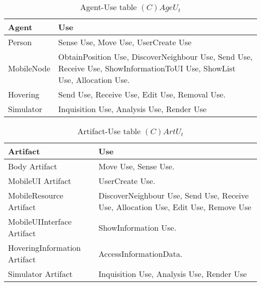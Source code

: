 \begin{table}[H]
	\centering
	\begin{tabular}{|p{4cm}|p{8cm}|}
			\hline
			\textbf{Agent} & \textbf{Use} \\
			\hline
			Person & Sense Use, Move Use, UserCreate Use\\
			\hline
      MobileNode & ObtainPosition Use, DiscoverNeighbour Use, Send Use, Receive Use,
      ShowInformationToUI Use, ShowList Use, Allocation Use.  \\
			\hline
			Hovering & Send Use, Receive Use, Edit Use, Removal Use. \\
			\hline
			Simulator & Inquisition Use, Analysis Use, Render Use \\
			\hline
		\end{tabular}
	\caption{Agent-Use table $(C)AgeU_t$}
	\label{tab:cageut}
\end{table}

\begin{table}[H]
	\centering
	\begin{tabular}{|p{4cm}|p{8cm}|}
			\hline
			\textbf{Artifact} & \textbf{Use} \\
			\hline
			Body Artifact & Move Use, Sense Use. \\
			\hline
			MobileUI Artifact & UserCreate Use. \\
			\hline
      MobileResource Artifact & DiscoverNeighbour Use, Send Use, Receive Use,
      Allocation Use, Edit Use, Remove Use \\
			\hline
			MobileUIInterface Artifact & ShowInformation Use. \\
			\hline
			HoveringInformation Artifact & AccessInformationData. \\
			\hline
			Simulator Artifact & Inquisition Use, Analysis Use, Render Use \\
			\hline
		\end{tabular}
	\caption{Artifact-Use table $(C)ArtU_t$}
	\label{tab:cartut}
\end{table}

